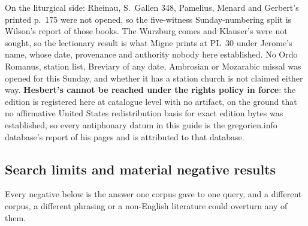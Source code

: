 On the liturgical side: Rheinau, S.~Gallen 348, Pamelius, Menard and Gerbert's
printed p.~175 were not opened, so the five-witness Sunday-numbering split is
Wilson's report of those books. The Wurzburg comes and Klauser's  were not sought, so the lectionary result is what Migne prints at
PL~30 under Jerome's name, whose date, provenance and authority nobody here
established. No Ordo Romanus, station list, Breviary of any date, Ambrosian or
Mozarabic missal was opened for this Sunday, and whether it has a station church
is not claimed either way. \textbf{Hesbert's  cannot be reached under the rights policy in force}: the edition is
registered here at catalogue level with no artifact, on the ground that no
affirmative United States redistribution basis for exact edition bytes was
established, so every antiphonary datum in this guide is the gregorien.info
database's report of his pages and is attributed to that database.

\subsection*{Search limits and material negative results}

Every negative below is the answer one corpus gave to one query, and a different
corpus, a different phrasing or a non-English literature could overturn any of
them.

